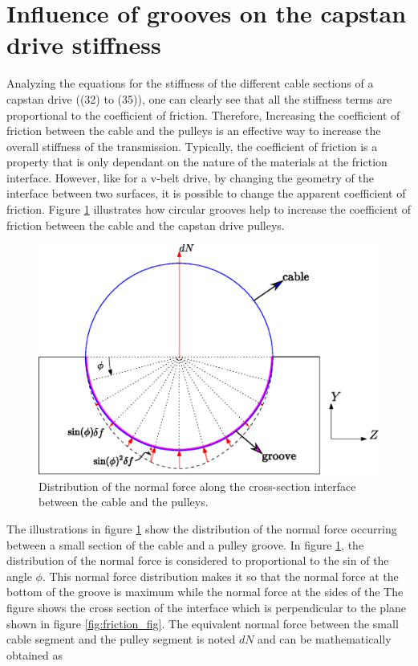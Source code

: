 \documentclass[twocolumn,10pt]{asme2ej}
\begin{document}
\section{Influence of grooves on the capstan drive stiffness}
 Analyzing the equations for the stiffness of the different cable sections of a capstan drive ((32) to (35)), one can clearly see that all the stiffness terms are proportional to the coefficient of friction. Therefore, Increasing the coefficient of friction between the cable and the pulleys is an effective way to increase the overall stiffness of the transmission. Typically, the coefficient of friction is a property that is only dependant on the nature of the materials at the friction interface. However, like for a v-belt drive, by changing the geometry of the interface between two surfaces, it is possible to change the apparent coefficient of friction. Figure \ref{fig:distib_force} illustrates how circular grooves help to increase the coefficient of friction between the cable and the capstan drive pulleys.\\
 \begin{figure}
    \centering
    \includegraphics[width =0.8\columnwidth]{distribution_tension_gen.eps}
    \caption{Distribution of the normal force along the cross-section interface between the cable and the pulleys.}
    \label{fig:distib_force}
\end{figure}
 The illustrations in figure \ref{fig:distib_force} show the distribution of the normal force occurring between a small section of the cable and a pulley groove. In figure \ref{fig:distib_force}, the distribution of the normal force is considered to proportional to the sin of the angle $\phi$. This normal force distribution makes it so that the normal force at the bottom of the groove is maximum while the normal force at the sides of the  The figure shows the cross section of the interface which is perpendicular to the plane shown in figure \ref{fig:friction_fig}. The equivalent normal force between the small cable segment and the pulley segment is noted $dN$ and can be mathematically obtained as 
\end{document}
